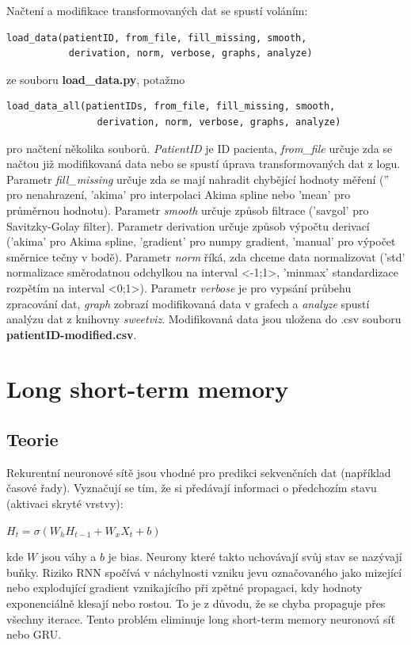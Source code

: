 Načtení a modifikace transformovaných dat se spustí voláním:
\begin{verbatim}
load_data(patientID, from_file, fill_missing, smooth,
           derivation, norm, verbose, graphs, analyze)
\end{verbatim}
ze souboru \textbf{load\_data.py}, potažmo
\begin{verbatim}
load_data_all(patientIDs, from_file, fill_missing, smooth,
                derivation, norm, verbose, graphs, analyze)
\end{verbatim}
pro načtení několika souborů. \textit{PatientID} je ID pacienta, \textit{from\_file} určuje zda se načtou již modifikovaná data nebo se spustí úprava transformovaných dat z logu. Parametr \textit{fill\_missing} určuje zda se mají nahradit chybějící hodnoty měření ('' pro nenahrazení, 'akima' pro interpolaci Akima spline nebo 'mean' pro průměrnou hodnotu). Parametr \textit{smooth} určuje způsob filtrace ('savgol' pro Savitzky-Golay filter). Parametr derivation určuje způsob výpočtu derivací ('akima' pro Akima spline, 'gradient' pro numpy gradient, 'manual' pro výpočet směrnice tečny v bodě). Parametr \textit{norm} říká, zda chceme data normalizovat ('std' normalizace směrodatnou odchylkou na interval <-1;1>, 'minmax' standardizace rozpětím na interval <0;1>). Parametr \textit{verbose} je pro vypsání průbehu zpracování dat, \textit{graph} zobrazí modifikovaná data v grafech a \textit{analyze} spustí analýzu dat z knihovny \textit{sweetviz}. Modifikovaná data jsou uložena do .csv souboru \textbf{patientID-modified.csv}.


\section{Long short-term memory}
\label{ch:lstm}

\subsection{Teorie}

Rekurentní neuronové sítě jsou vhodné pro predikci sekvenčních dat (například časové řady). Vyznačují se tím, že si předávají informaci o předchozím stavu (aktivaci skryté vrstvy):

$H_{t}=\sigma (W_{h}H_{t-1}+W_{x}X_{t}+b)$

\noindent kde $W$ jsou váhy a $b$ je bias. Neurony které takto uchovávají svůj stav se nazývají buňky. Riziko RNN spočívá v náchylnosti vzniku jevu označovaného jako mizející nebo explodující gradient vznikajícího při zpětné propagaci, kdy hodnoty exponenciálně klesají nebo rostou. To je z důvodu, že se chyba propaguje přes všechny iterace. Tento problém eliminuje long short-term memory neuronová síť nebo GRU.

